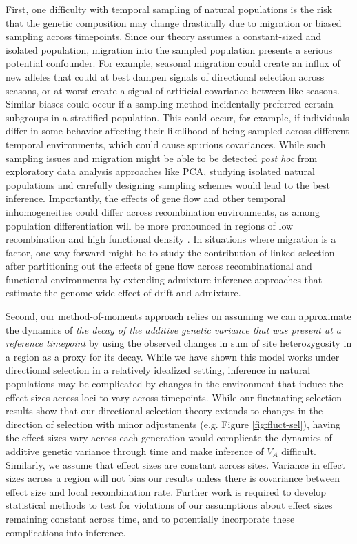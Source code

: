 \documentclass[11pt]{article}
\newcommand{\vb}[1]{{\it \color{blue} #1}}
\begin{document}
First, one difficulty with temporal sampling of natural populations is the risk
that the genetic composition may change drastically due to migration or biased
sampling across timepoints. Since our theory assumes a constant-sized and
isolated population, migration into the sampled population presents a serious
potential confounder. For example, seasonal migration could create an influx of
new alleles that could at best dampen signals of directional selection across
seasons, or at worst create a signal of artificial covariance between like
seasons. Similar biases could occur if a sampling method incidentally preferred
certain subgroups in a stratified population. This could occur, for example, if
individuals differ in some behavior affecting their likelihood of being sampled
across different temporal environments, which could cause spurious covariances.
While such sampling issues and migration might be able to be detected
\emph{post hoc} from exploratory data analysis approaches like PCA, studying
isolated natural populations and carefully designing sampling schemes would
lead to the best inference. Importantly, the effects of gene flow and other
temporal inhomogeneities could differ across recombination environments, as
among population differentiation will be more pronounced in regions of low
recombination and high functional density
\parencite{Keinan2010-ry,Burri2017-ml,Nachman2012-sw}. In situations where
  migration is a factor, one way forward might be to study the contribution of
  linked selection after partitioning out the effects of gene flow across
  recombinational and functional environments by extending admixture inference
approaches that estimate the genome-wide effect of drift and admixture.

Second, our method-of-moments approach relies on assuming we can approximate
the dynamics of \vb{the decay of the additive genetic variance that was present
at a reference timepoint} by using the observed changes in sum of site
heterozygosity in a region as a proxy for its decay. While we have shown this
model works under directional selection in a relatively idealized setting,
inference in natural populations may be complicated by changes in the
environment that induce the effect sizes across loci to vary across timepoints.
While our fluctuating selection results show that our directional selection
theory extends to changes in the direction of selection with minor adjustments
(e.g. Figure \ref{fig:fluct-sel}), having the effect sizes vary across each
generation would complicate the dynamics of additive genetic variance through
time and make inference of $V_A$ difficult.  Similarly, we assume that effect
sizes are constant across sites. Variance in effect sizes across a region will
not bias our results unless there is covariance between effect size and local
recombination rate. Further work is required to develop statistical methods to
test for violations of our assumptions about effect sizes remaining constant
across time, and to potentially incorporate these complications into inference.
\end{document}
